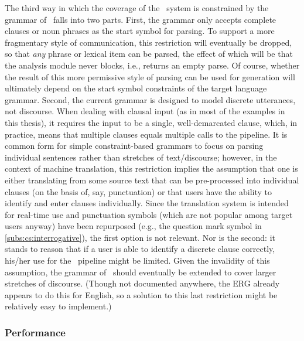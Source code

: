 The third way in which the coverage of the \depicto\ system is constrained by
the grammar of \sclera\ falls into two parts. First, the grammar only accepts
complete clauses or noun phrases as the start symbol for parsing. To support a
more fragmentary style of communication, this restriction will eventually be
dropped, so that \emph{any} phrase or lexical item can be parsed, the effect of
which will be that the analysis module never blocks, i.e., returns an empty
parse. Of course, whether the result of this more permissive style of parsing
can be used for generation will ultimately depend on the start symbol
constraints of the target language grammar. Second, the current grammar is
designed to model discrete utterances, not discourse. When dealing with clausal
input (as in most of the examples in this thesis), it requires the input to be
a single, well-demarcated clause, which, in practice, means that multiple
clauses equals multiple calls to the pipeline. It is common form for simple
constraint-based grammars to focus on parsing individual sentences rather than
stretches of text/discourse; however, in the context of machine translation,
this restriction implies the assumption that one is either translating from
some source text that can be pre-processed into individual clauses (on the
basis of, say, punctuation) or that users have the ability to identify and
enter clauses individually. Since the translation system is intended for
real-time use and punctuation symbols (which are not popular among target users
anyway) have been repurposed (e.g., the question mark symbol in
\cref{subs:cs:interrogative}), the first option is not relevant. Nor is the
second: it stands to reason that if a user is able to identify a discrete
clause correctly, his/her use for the \depicto\ pipeline might be limited.
Given the invalidity of this assumption, the grammar of \sclera\ should
eventually be extended to cover larger stretches of discourse. (Though not
documented anywhere, the ERG \citep{flickinger2014towards} already appears to
do this for English, so a solution to this last restriction might be relatively
easy to implement.)

\subsubsection{Performance}

